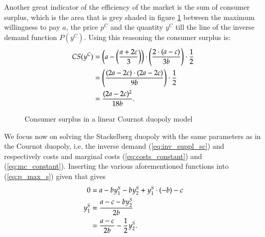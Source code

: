 \documentclass[12pt]{article}
\numberwithin{equation}{subsection}
\begin{document}
Another great indicator of the efficiency of the market is the sum of consumer surplus, which is the area that is grey shaded in figure \ref{fig:1} between the maximum willingness to pay $a$, the price $p^C$ and the quantity $y^C$ till the line of the inverse demand function $P(y^C)$. Using this reasoning the consumer surplus is: \begin{align}
\label{eq:cons_surpl_cournot}
CS(y^C)& = \left(a - \left(\frac{a + 2c}{3}\right) \right)  \cdot \left( \frac{2 \cdot (a - c)}{3b} \right) \cdot \frac{1}{2}\notag \\
& = \left(\frac{(2a - 2c) \cdot (2a - 2c)}{9b}\right) \cdot \frac{1}{2} \notag \\
& = \frac{(2a - 2c)^2}{18b}.
\end{align}

\renewcommand{\figurename}{\textbf{Fig.}}
\begin{figure}[htpb]
\caption{Consumer surplus in a linear Cournot duopoly model}
\begin{center}
\label{fig:1}
\end{center}
\end{figure}
We focus now on solving the Stackelberg duopoly with the same parameters as in the Cournot duopoly, i.e. the inverse demand (\ref{eq:inv_suppl_sc}) and respectively costs and marginal costs (\ref{eq:costs_constant}) and (\ref{eq:mc_constant}). Inserting the various aforementioned functions into (\ref{eq:p_max_s}) given that  gives \begin{align}
\label{eq:stack_rapport}
0 &= a - by^S_1 - by^S_2 + y^S_1 \cdot (-b) - c \notag \\
y^S_1 & = \frac{a - c - by^S_2}{2b} \notag \\
& = \frac{a - c}{2b} - \frac{1}{2}y^S_2.
\end{align}
\end{document}
